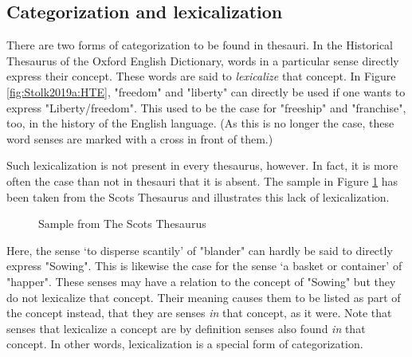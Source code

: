 \subsection{Categorization and lexicalization}

There are two forms of categorization to be found in thesauri. In the Historical Thesaurus of the Oxford English Dictionary, words in a particular sense directly express their concept. These words are said to \emph{lexicalize} that concept. 
In Figure \ref{fig:Stolk2019a:HTE}, "freedom" and "liberty" can directly be used if one wants to express "Liberty/freedom". 
This used to be the case for "freeship" and "franchise", too, in the history of the English language. 
(As this is no longer the case, these word senses are marked with a cross in front of them.) 

Such lexicalization is not present in every thesaurus, however. 
In fact, it is more often the case than not in thesauri that it is absent. 
The sample in Figure \ref{fig:Stolk2019a:ScT-categorization} has been taken from the Scots Thesaurus \cite{ref-ScT} and illustrates this lack of lexicalization. 
\begin{figure}[htbp]
	\framebox[\textwidth]{
		\scalebox{0.65}[0.65]{
			
		}
	}
	\caption[]{\label{fig:Stolk2019a:ScT-categorization} Sample from The Scots Thesaurus}
\end{figure}
Here, the sense ‘to disperse scantily’ of "blander" can hardly be said to directly express "Sowing". 
This is likewise the case for the sense ‘a basket or container’ of "happer". 
These senses may have a relation to the concept of "Sowing" but they do not lexicalize that concept. 
Their meaning causes them to be listed as part of the concept instead, that they are senses \emph{in} that concept, as it were.
Note that senses that lexicalize a concept are by definition senses also found \emph{in} that concept. 
In other words, lexicalization is a special form of categorization. 

